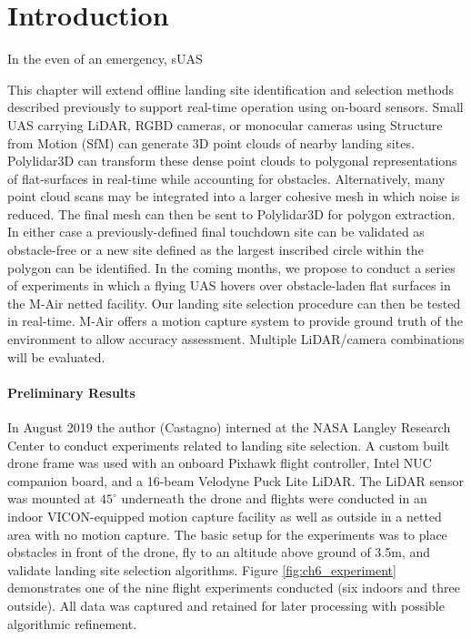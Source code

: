\section{Introduction}

In the even of an emergency, \acf{sUAS}


This chapter will extend offline landing site identification and selection methods described previously to support real-time operation using on-board sensors. Small UAS carrying LiDAR, RGBD cameras, or monocular cameras using Structure from Motion (SfM) can generate 3D point clouds of nearby landing sites. Polylidar3D can transform these dense point clouds to polygonal representations of flat-surfaces in real-time while accounting for obstacles.  Alternatively, many point cloud scans may be integrated into a larger cohesive mesh in which noise is reduced. The final mesh can then be sent to Polylidar3D for polygon extraction. In either case a previously-defined final touchdown site can be validated as obstacle-free or a new site defined as the largest inscribed circle within the polygon can be identified.
In the coming months, we propose to conduct a series of experiments in which a flying UAS hovers over obstacle-laden flat surfaces in the M-Air netted facility. Our landing site selection procedure can then be tested in real-time. M-Air offers a motion capture system to provide ground truth of the environment to allow accuracy assessment. Multiple LiDAR/camera combinations will be evaluated.

\paragraph{Preliminary Results}

In August 2019 the author (Castagno) interned at the NASA Langley Research Center to conduct experiments related to landing site selection. A custom built drone frame was used with an onboard Pixhawk flight controller, Intel NUC companion board, and a 16-beam Velodyne Puck Lite LiDAR. The LiDAR sensor was mounted at $45^{\circ}$ underneath the drone and flights were conducted in an indoor VICON-equipped motion capture facility as well as outside in a netted area with no motion capture. The basic setup for the experiments was to place obstacles in front of the drone, fly to an altitude above ground of 3.5m, and validate landing site selection algorithms. Figure \ref{fig:ch6_experiment} demonstrates one of the nine flight experiments conducted (six indoors and three outside). All data was captured and retained for later processing with possible algorithmic refinement.

